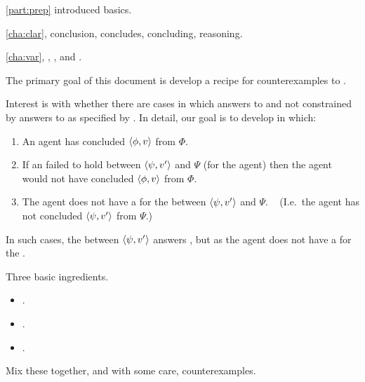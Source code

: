 \begin{note}
  \autoref{part:prep} introduced basics.

  \autoref{cha:clar}, conclusion, concludes, concluding, reasoning.

  \autoref{cha:var}, \qWhyV{}, \qHowV{}, and \issueConstraint{}.

  The primary goal of this document is develop a recipe for counterexamples to \issueConstraint{}.

  Interest is with whether there are cases in which answers to \qWhyV{} and not constrained by answers to \qHowV{} as specified by \issueConstraint{}.
  In detail, our goal is to develop  in which:

  \begin{enumerate}
  \item
    An agent has concluded \(\langle \phi, v \rangle\) from \(\Phi\).
  \item
    If an \ros{} failed to hold between \(\langle \psi, v' \rangle\) and \(\Psi\) (for the agent) then the agent would not have concluded \(\langle \phi, v \rangle\) from \(\Phi\).
  \item
    The agent does not have a \wit{} for the \ros{} between \(\langle \psi, v' \rangle\) and \(\Psi\).%
    \mbox{ }\hfill%
    (I.e.\ the agent has not concluded \(\langle \psi, v' \rangle\) from \(\Psi\).)
  \end{enumerate}

  In such cases, the \ros{} between \(\langle \psi, v' \rangle\) answers \qWhyV{}, but as the agent does not have a \wit{} for the \ros{}.
\end{note}

\begin{note}
  Three basic ingredients.

  \begin{itemize}
  \item
    .
  \item
    .
  \item
    .
  \end{itemize}

  Mix these together, and with some care, counterexamples.
\end{note}

